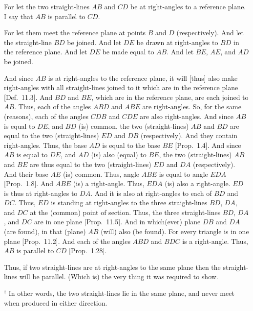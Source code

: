 \begin{Parallel}{}{}
{
\centerline{}

For let the two straight-lines $AB$ and $CD$ be at right-angles
to a reference plane. I say that $AB$ is parallel to $CD$.

For let them meet the reference plane at points $B$ and $D$ (respectively).
And let the straight-line $BD$ be joined. And let $DE$ 
be drawn at right-angles to $BD$ in the reference plane. And
let $DE$ be made equal to $AB$. And let $BE$, $AE$, and $AD$ be joined.

And since $AB$ is at right-angles to the reference plane, it will [thus] also
make right-angles with all straight-lines joined to it which are in the
reference plane [Def.~11.3]. And
$BD$ and $BE$, which are in the reference plane, are each  joined to $AB$.
Thus, each of the angles $ABD$ and $ABE$ are right-angles. So, for the
same (reasons), each of the angles $CDB$ and $CDE$ are also right-angles.
And since $AB$ is equal to $DE$, and $BD$ (is) common, the two
(straight-lines) $AB$ and $BD$ are equal to the two (straight-lines) 
$ED$ and $DB$ (respectively). And they contain right-angles. Thus, the
base $AD$ is equal to the base $BE$ [Prop.~1.4].
And since $AB$ is equal to $DE$, and $AD$ (is) also (equal) to $BE$,  the two
(straight-lines) $AB$ and $BE$ are thus equal to the two (straight-lines) $ED$ and $DA$ (respectively). And their base $AE$ (is) common. Thus, angle $ABE$ is equal to angle $EDA$ [Prop.~1.8]. 
And $ABE$ (is) a right-angle. Thus, $EDA$ (is) also a right-angle.
$ED$ is thus at right-angles to $DA$.  And it is also at right-angles to
each of $BD$ and $DC$. Thus, $ED$ is standing at right-angles
to the three straight-lines $BD$, $DA$, and $DC$ at the (common)
point of section. Thus, the three straight-lines $BD$, $DA$,
and $DC$ are in one plane [Prop.~11.5]. And in
which(ever) plane $DB$ and $DA$ (are found), in that (plane) $AB$ (will) also (be found).
For every triangle is in one plane [Prop.~11.2].
And each of the angles $ABD$ and $BDC$ is a right-angle. Thus, $AB$ is
parallel to $CD$ [Prop.~1.28].

Thus, if  two straight-lines are at right-angles to the same
plane then the straight-lines will be parallel. (Which is) the very thing it
was required to show.}
\end{Parallel}
{\footnotesize\noindent$^\dag$ In other words,
the two straight-lines lie in the same plane, and never meet when
produced in either direction.}

